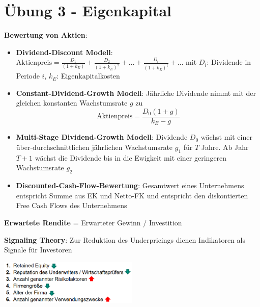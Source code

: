 \section{Übung 3 - Eigenkapital}

\textbf{Bewertung von Aktien}:
\begin{itemize}
	\item \textbf{Dividend-Discount Modell}: $\text{Aktienpreis}=\frac{D_1}{(1+k_E)}+\frac{D_2}{(1+k_E)^2}+\ldots+\frac{D_t}{(1+k_E)^t}+\ldots$ mit $D_i$: Dividende in Periode $i$, $k_E$: Eigenkapitalkosten
	\item \textbf{Constant-Dividend-Growth Modell}: Jährliche Dividende nimmt mit der gleichen konstanten Wachstumsrate $g$ zu
	$$\text{Aktienpreis}=\frac{D_0(1+g)}{k_E-g}$$
	\item \textbf{Multi-Stage Dividend-Growth Modell}: Dividende $D_0$ wächst mit einer über-durchschnittlichen jährlichen Wachstumsrate $g_1$ für $T$ Jahre. Ab Jahr $T+1$ wächst die Dividende bis in die Ewigkeit mit einer geringeren Wachstumsrate $g_2$
	\item \textbf{Discounted-Cash-Flow-Bewertung}: Gesamtwert eines Unternehmens entspricht Summe aus EK und Netto-FK und entspricht den diskontierten Free Cash Flows des Unternehmens 
\end{itemize}
\bigskip
\textbf{Erwartete Rendite} = Erwarteter Gewinn / Investition

\textbf{Signaling Theory}: Zur Reduktion des Underpricings dienen Indikatoren als Signale für Investoren
\begin{center}
	\includegraphics[width=0.5\textwidth]{images/e6.png}
\end{center}